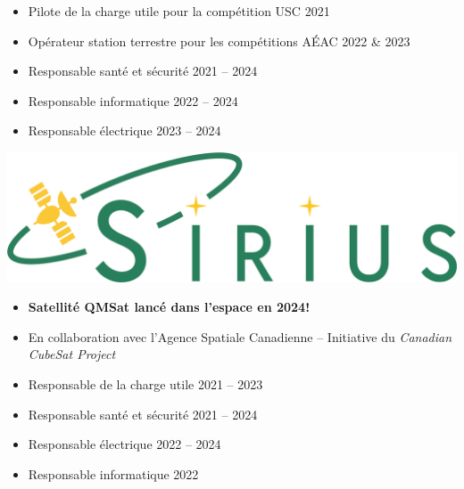 \documentclass[10pt,a4paper,withhyper]{altacv}
\begin{document}
\begin{itemize}
\item Pilote de la charge utile pour la compétition USC 2021
\item Opérateur station terrestre pour les compétitions AÉAC 2022 \& 2023
\item Responsable santé et sécurité 2021 -- 2024
\item Responsable informatique 2022 -- 2024
\item Responsable électrique 2023 -- 2024
\end{itemize}

\divider

\hfill\begin{minipage}{2.5cm}
    \includegraphics[width=\linewidth]{figures/sirius}
\end{minipage}
\vspace{-0.75cm}

\begin{itemize}
\item \textbf{Satellité QMSat lancé dans l'espace en 2024!}
\item En collaboration avec l'Agence Spatiale Canadienne -- Initiative du \textit{Canadian CubeSat Project}
\item Responsable de la charge utile 2021 -- 2023
\item Responsable santé et sécurité 2021 -- 2024
\item Responsable électrique 2022 -- 2024
\item Responsable informatique 2022
\end{itemize}

\divider
\end{document}
